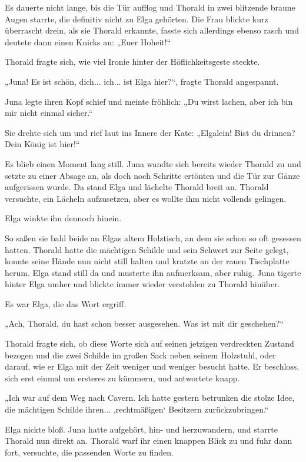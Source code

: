 Es dauerte nicht lange, bis die Tür aufflog und Thorald in zwei blitzende braune Augen starrte, die definitiv nicht zu Elga gehörten. Die Frau blickte kurz überrascht drein, als sie Thorald erkannte, fasste sich allerdings ebenso rasch und deutete dann einen Knicks an: „Euer Hoheit!“

Thorald fragte sich, wie viel Ironie hinter der Höflichkeitsgeste steckte.

„Juna! Es ist schön, dich... ich... ist Elga hier?“, fragte Thorald angespannt.

Juna legte ihren Kopf schief und meinte fröhlich: „Du wirst lachen, aber ich bin mir nicht einmal sicher.“

Sie drehte sich um und rief laut ins Innere der Kate: „Elgalein! Bist du drinnen? Dein König ist hier!“

Es blieb einen Moment lang still. Juna wandte sich bereits wieder Thorald zu und setzte zu einer Absage an, als doch noch Schritte ertönten und die Tür zur Gänze aufgerissen wurde. Da stand Elga und lächelte Thorald breit an. Thorald versuchte, ein Lächeln aufzusetzen, aber es wollte ihm nicht vollends gelingen.

Elga winkte ihn dennoch hinein.



\trennzeichen



So saßen sie bald beide an Elgas altem Holztisch, an dem sie schon so oft gesessen hatten. Thorald hatte die mächtigen Schilde und sein Schwert zur Seite gelegt, konnte seine Hände nun nicht still halten und kratzte an der rauen Tischplatte herum. Elga stand still da und musterte ihn aufmerksam, aber ruhig. Juna tigerte hinter Elga umher und blickte immer wieder verstohlen zu Thorald hinüber.

Es war Elga, die das Wort ergriff.

„Ach, Thorald, du hast schon besser ausgesehen. Was ist mit dir geschehen?“

Thorald fragte sich, ob diese Worte sich auf seinen jetzigen verdreckten Zustand bezogen und die zwei Schilde im großen Sack neben seinem Holzstuhl, oder darauf, wie er Elga mit der Zeit weniger und weniger besucht hatte. Er beschloss, sich erst einmal um ersteres zu kümmern, und antwortete knapp.

„Ich war auf dem Weg nach Cavern. Ich hatte gestern betrunken die stolze Idee, die mächtigen Schilde ihren... ‚rechtmäßigen‘ Besitzern zurückzubringen.“

Elga nickte bloß. Juna hatte aufgehört, hin- und herzuwandern, und starrte Thorald nun direkt an. Thorald warf ihr einen knappen Blick zu und fuhr dann fort, versuchte, die passenden Worte zu finden.

